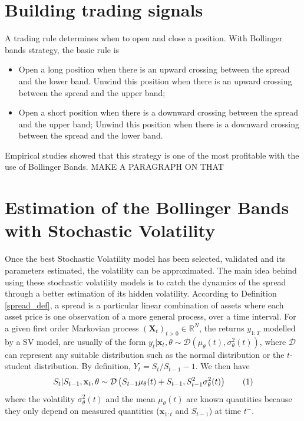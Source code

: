 \documentclass[11pt,a4,twosided,singlespacing,titlepagenumber=on]{scrreprt}
\numberwithin{equation}{chapter} %
\theoremstyle{remark}
\newcommand{\matr}[1]{\mathbf{#1}}
\newcommand\numberthis{\addtocounter{equation}{1}\tag{\theequation}}
\begin{document}
\section{Building trading signals}

A trading rule determines when to open and close a position. With Bollinger bands strategy, the basic rule is

\begin{itemize}
\item Open a long position when there is an upward crossing between the spread and the lower band. Unwind this position when there is an upward crossing between the spread and the upper band;
\item Open a short position when there is a downward crossing between the spread and the upper band; Unwind this position when there is a downward crossing between the spread and the lower band.
\end{itemize}
Empirical studies showed that this strategy is one of the most profitable with the use of Bollinger Bands. MAKE A PARAGRAPH ON THAT

\section{Estimation of the Bollinger Bands with Stochastic Volatility}
\label{sec:estimation_bollinger_bands_sv}
Once the best Stochastic Volatility model has been selected, validated and its parameters estimated, the volatility can be approximated. The main idea behind using these stochastic volatility models is to catch the dynamics of the spread through a better estimation of its hidden volatility. According to Definition \ref{spread_def}, a spread is a particular linear combination of assets where each asset price is one observation of a more general process, over a time interval. For a given first order Markovian process $(\matr{X}_t)_{t>0} \in \mathbb{R}^N$, the returns $y_{1:T}$ modelled by a SV model, are usually of the form $y_t | \matr{x}_t, \theta \sim \mathcal{D} \left( \mu_\theta(t), \sigma_\theta^2(t) \right)$, where $\mathcal{D}$ can represent any suitable distribution such as the normal distribution or the $t$-student distribution. By definition, $Y_t = S_t / S_{t-1} - 1$. We then have
\begin{equation}
S_t | S_{t-1}, \matr{x}_t, \theta \sim \mathcal{D} \left(S_{t-1} \mu_\theta(t)+S_{t-1}, S_{t-1}^2 \sigma_\theta^2(t) \right) \numberthis \label{equation_price_vol}
\end{equation}
where the volatility $\sigma_\theta^2(t)$ and the mean $\mu_\theta(t)$ are known quantities because they only depend on measured quantities ($\matr{x}_{1:t}$ and $S_{t-1}$) at time $t^-$.
\end{document}
